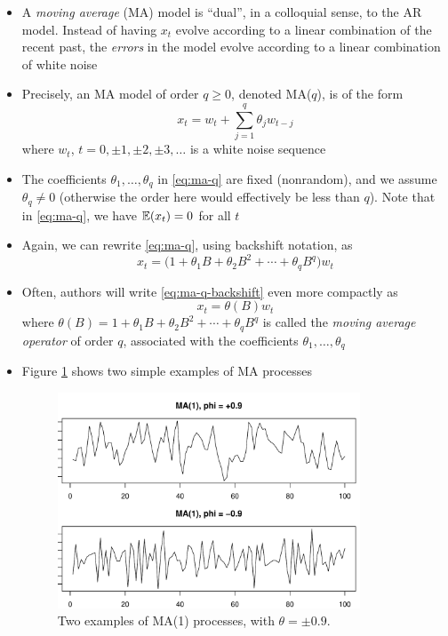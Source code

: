 \documentclass{article}
\begin{document}
\begin{itemize}
\item A \emph{moving average} (MA) model is ``dual'', in a colloquial sense, to
  the AR model. Instead of having $x_t$ evolve according to a linear combination
  of the recent past, the \emph{errors} in the model evolve according to a
  linear combination of white noise

\item Precisely, an MA model of order $q \geq 0$, denoted MA($q$), is of the
  form 
  \begin{equation}
  \label{eq:ma-q}
  x_t = w_t + \sum_{j=1}^q \theta_j w_{t-j} 
  \end{equation}
  where $w_t$, $t = 0, \pm 1, \pm 2, \pm 3, \dots$ is a white noise
  sequence

\item The coefficients $\theta_1,\dots,\theta_q$ in \eqref{eq:ma-q} are fixed
  (nonrandom), and we assume $\theta_q \not= 0$ (otherwise the order here would 
  effectively be less than $q$). Note that in \eqref{eq:ma-q}, we have $\mathbb{E}(x_t)
  = 0$ for all $t$ 

\item Again, we can rewrite \eqref{eq:ma-q}, using backshift notation, as 
  \begin{equation}
  \label{eq:ma-q-backshift}
  x_t = \Big(1 + \theta_1 B + \theta_2 B^2 + \cdots + \theta_q B^q \Big) w_t   
  \end{equation}

\item Often, authors will write \eqref{eq:ma-q-backshift} even more compactly as   
  \begin{equation}
  \label{eq:ma-q-operator}
  x_t = \theta(B) w_t 
  \end{equation}
  where $\theta(B) = 1 + \theta_1 B + \theta_2 B^2 + \cdots + \theta_q B^q$ is
  called the \emph{moving average operator} of order $q$, associated with the
  coefficients $\theta_1,\dots,\theta_q$

\item Figure \ref{fig:ma} shows two simple examples of MA processes

\begin{figure}[htb]
\centering
\includegraphics[width=0.85\textwidth]{fig/ma-1.pdf}
\caption{Two examples of MA(1) processes, with $\theta = \pm 0.9$.}
\label{fig:ma}
\end{figure}
\end{itemize}
\end{document}
